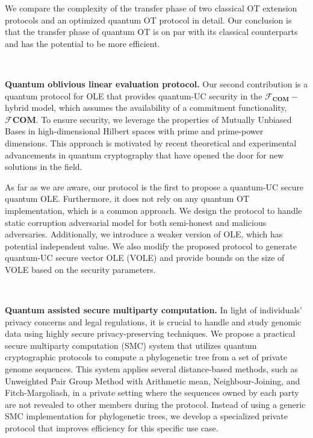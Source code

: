 We compare the complexity of the transfer phase of two classical OT extension protocols \cite{ALSZ13, KOS15} and an optimized quantum OT protocol in detail. Our conclusion is that the transfer phase of quantum OT is on par with its classical counterparts and has the potential to be more efficient.

\

\noindent\textbf{Quantum oblivious linear evaluation protocol.} Our second contribution is a quantum protocol for OLE that provides quantum-UC security in the $\mathcal{F}_{\textbf{COM}}-$hybrid model, which assumes the availability of a commitment functionality, $\mathcal{F}{\textbf{COM}}$. To ensure security, we leverage the properties of Mutually Unbiased Bases in high-dimensional Hilbert spaces with prime and prime-power dimensions. This approach is motivated by recent theoretical and experimental advancements in quantum cryptography \cite{BPT00,DEBZ10,Zhongetal2015,BHVBFHM18,DHMPPV21} that have opened the door for new solutions in the field.

As far as we are aware, our protocol is the first to propose a quantum-UC secure quantum OLE. Furthermore, it does not rely on any quantum OT implementation, which is a common approach. We design the protocol to handle static corruption adversarial model for both semi-honest and malicious adversaries. Additionally, we introduce a weaker version of OLE, which has potential independent value. We also modify the proposed protocol to generate quantum-UC secure vector OLE (VOLE) and provide bounds on the size of VOLE based on the security parameters.

\

\noindent\textbf{Quantum assisted secure multiparty computation.} In light of individuals' privacy concerns and legal regulations, it is crucial to handle and study genomic data using highly secure privacy-preserving techniques. We propose a practical secure multiparty computation (SMC) system that utilizes quantum cryptographic protocols to compute a phylogenetic tree from a set of private genome sequences. This system applies several distance-based methods, such as Unweighted Pair Group Method with Arithmetic mean, Neighbour-Joining, and Fitch-Margoliash, in a private setting where the sequences owned by each party are not revealed to other members during the protocol. Instead of using a generic SMC implementation for phylogenetic trees, we develop a specialized private protocol that improves efficiency for this specific use case.


